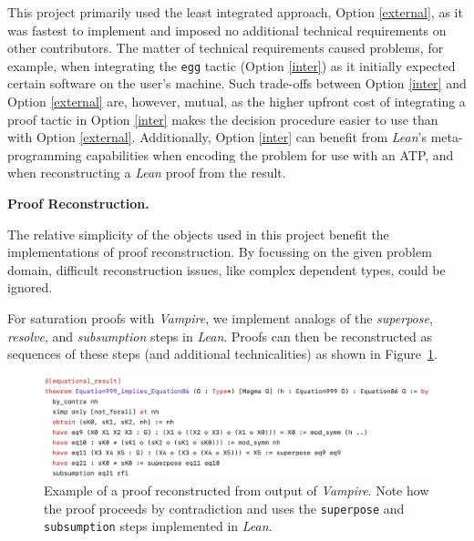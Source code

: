 This project primarily used the least integrated approach, Option \ref{external}, as it was fastest to implement and imposed no additional technical requirements on other contributors.
The matter of technical requirements caused problems, for example, when integrating the \texttt{egg} tactic (Option \ref{inter}) as it initially expected certain software on the user's machine.
Such trade-offs between Option \ref{inter} and Option \ref{external} are, however, mutual, as the higher upfront cost of integrating a proof tactic in Option \ref{inter} makes the decision procedure easier to use than with Option \ref{external}.
Additionally, Option \ref{inter} can benefit from \emph{Lean}'s meta-programming capabilities when encoding the problem for use with an ATP, and when reconstructing a \emph{Lean} proof from the result.

\textbf{Proof Reconstruction.}

The relative simplicity of the objects used in this project benefit the implementations of proof reconstruction.
By focussing on the given problem domain, difficult reconstruction issues, like complex dependent types, could be ignored.

For saturation proofs with \emph{Vampire}, we implement analogs of the \emph{superpose}, \emph{resolve}, and \emph{subsumption} steps in \emph{Lean}. 
Proofs can then be reconstructed as sequences of these steps (and additional technicalities) as shown in Figure~\ref{fig:vampire-example}.

\begin{figure}
  \centering
  \includegraphics[width=\textwidth]{vampire-example.png}
  \caption{Example of a proof reconstructed from output of \emph{Vampire}. Note how the proof proceeds by contradiction and uses the \texttt{superpose} and \texttt{subsumption} steps implemented in \emph{Lean}.}
  \label{fig:vampire-example}
\end{figure}

